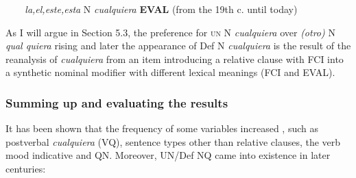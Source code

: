 \begin{styleStandard}
\ \ \textit{\ \ la,el,este,esta} N \textit{cualquiera} \textbf{EVAL} (from the 19th c. until today)
\end{styleStandard}

\begin{styleStandard}
As I will argue in Section 5.3, the preference for \textsc{un}\textit{ }N\textit{ cualquiera} over \textit{(otro) }N\textit{ qual quiera }rising\textit{ }and later the appearance of Def N\textit{ cualquiera} is the result of the reanalysis of \textit{cualquiera} from an item introducing a relative clause with FCI into a synthetic nominal modifier with different lexical meanings (FCI and EVAL). 
\end{styleStandard}

\subsubsection[Summing up and evaluating the results ]{Summing up and evaluating the results }
\begin{styleStandard}
It has been shown that the frequency of some variables increased , such as postverbal \textit{cualquiera} (VQ), sentence types other than relative clauses, the verb mood indicative and QN. Moreover, UN/Def NQ came into existence in later centuries:
\end{styleStandard}

